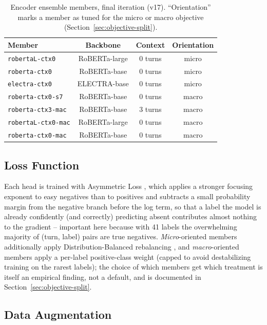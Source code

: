 \begin{table}[H]
\centering
\caption{Encoder ensemble members, final iteration (v17). ``Orientation'' marks a member as
tuned for the micro or macro objective (Section~\ref{sec:objective-split}).}
\label{tab:members-v17}
\begin{tabular}{@{}lccc@{}}
\toprule
\textbf{Member} & \textbf{Backbone} & \textbf{Context} & \textbf{Orientation} \\
\midrule
\texttt{robertaL-ctx0} & RoBERTa-large & 0 turns & micro \\
\texttt{roberta-ctx0} & RoBERTa-base & 0 turns & micro \\
\texttt{electra-ctx0} & ELECTRA-base & 0 turns & micro \\
\texttt{roberta-ctx0-s7} & RoBERTa-base & 0 turns & macro \\
\texttt{roberta-ctx3-mac} & RoBERTa-base & 3 turns & macro \\
\texttt{robertaL-ctx0-mac} & RoBERTa-large & 0 turns & macro \\
\texttt{roberta-ctx0-mac} & RoBERTa-base & 0 turns & macro \\
\bottomrule
\end{tabular}
\end{table}

\subsection{Loss Function}
\label{sec:design-loss}

Each head is trained with Asymmetric Loss \citep{benbaruch2021asl}, which
applies a stronger focusing exponent to easy negatives than to positives and
subtracts a small probability margin from the negative branch before the
log term, so that a label the model is already confidently (and correctly)
predicting absent contributes almost nothing to the gradient -- important
here because with 41 labels the overwhelming majority of (turn, label)
pairs are true negatives. \emph{Micro}-oriented members additionally apply
Distribution-Balanced rebalancing \citep{wu2020distribution}, and
\emph{macro}-oriented members apply a per-label positive-class weight
(capped to avoid destabilizing training on the rarest labels); the choice of
which members get which treatment is itself an empirical finding, not a
default, and is documented in Section~\ref{sec:objective-split}.

\subsection{Data Augmentation}
\label{sec:design-augmentation}


